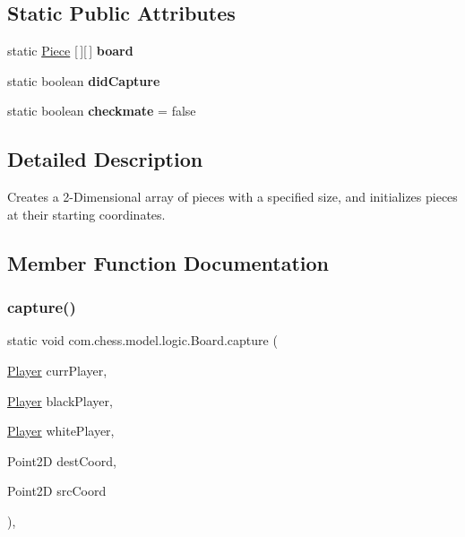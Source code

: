 \subsection*{Static Public Attributes}
\begin{DoxyCompactItemize}
\item 
\mbox{\label{classcom_1_1chess_1_1model_1_1logic_1_1_board_a2c6dd21cc83aa6bfb954fa7dcf7b3dad}} 
static \mbox{\hyperlink{classcom_1_1chess_1_1model_1_1pieces_1_1_piece}{Piece}} \mbox{[}$\,$\mbox{]}\mbox{[}$\,$\mbox{]} {\bfseries board}
\item 
\mbox{\label{classcom_1_1chess_1_1model_1_1logic_1_1_board_a84e73ca86b65fc880c739b259a83b4a2}} 
static boolean {\bfseries did\+Capture}
\item 
\mbox{\label{classcom_1_1chess_1_1model_1_1logic_1_1_board_ae7be380203f5dc677de9db1b70e27edf}} 
static boolean {\bfseries checkmate} = false
\end{DoxyCompactItemize}


\subsection{Detailed Description}
Creates a 2-\/Dimensional array of pieces with a specified size, and initializes pieces at their starting coordinates. 

\subsection{Member Function Documentation}
\mbox{\label{classcom_1_1chess_1_1model_1_1logic_1_1_board_a36d7690740c0df5bf65ad19a77301cb1}} 
\subsubsection{\texorpdfstring{capture()}{capture()}}
{\footnotesize\ttfamily static void com.\+chess.\+model.\+logic.\+Board.\+capture (\begin{DoxyParamCaption}\item[{\mbox{\hyperlink{classcom_1_1chess_1_1model_1_1logic_1_1_player}{Player}}}]{curr\+Player,  }\item[{\mbox{\hyperlink{classcom_1_1chess_1_1model_1_1logic_1_1_player}{Player}}}]{black\+Player,  }\item[{\mbox{\hyperlink{classcom_1_1chess_1_1model_1_1logic_1_1_player}{Player}}}]{white\+Player,  }\item[{Point2D}]{dest\+Coord,  }\item[{Point2D}]{src\+Coord }\end{DoxyParamCaption})\hspace{0.3cm}{\ttfamily [inline]}, {\ttfamily [static]}}

